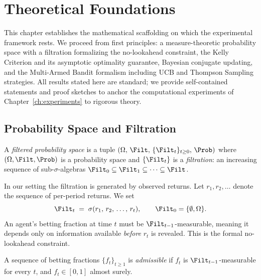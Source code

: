 \chapter{Theoretical Foundations}
\label{ch:foundations}

This chapter establishes the mathematical scaffolding on which the experimental
framework rests.  We proceed from first principles: a measure-theoretic
probability space with a filtration formalizing the no-lookahead constraint,
the Kelly Criterion and its asymptotic optimality guarantee, Bayesian conjugate
updating, and the Multi-Armed Bandit formalism including UCB and Thompson
Sampling strategies.  All results stated here are standard; we provide
self-contained statements and proof sketches to anchor the computational
experiments of Chapter~\ref{ch:experiments} to rigorous theory.

\section{Probability Space and Filtration}

\begin{definition}
\label{def:filtered_prob_space}
A \emph{filtered probability space} is a tuple
$(\Omega,\, \Filt,\, \{\Filt_t\}_{t \geq 0},\, \Prob)$
where $(\Omega, \Filt, \Prob)$ is a probability space and $\{\Filt_t\}$ is a
\emph{filtration}: an increasing sequence of sub-$\sigma$-algebras
$\Filt_0 \subseteq \Filt_1 \subseteq \cdots \subseteq \Filt$.
\end{definition}

In our setting the filtration is generated by observed returns.  Let
$r_1, r_2, \ldots$ denote the sequence of per-period returns.  We set
\[
    \Filt_t \;=\; \sigma(r_1,\, r_2,\, \ldots,\, r_t),
    \qquad \Filt_0 = \{\emptyset, \Omega\}.
\]
An agent's betting fraction at time $t$ must be $\Filt_{t-1}$-measurable,
meaning it depends only on information available \emph{before} $r_t$ is
revealed.  This is the formal no-lookahead constraint.

\begin{definition}
\label{def:admissible}
A sequence of betting fractions $\{f_t\}_{t \geq 1}$ is \emph{admissible} if
$f_t$ is $\Filt_{t-1}$-measurable for every $t$, and $f_t \in [0,1]$
almost surely.
\end{definition}

